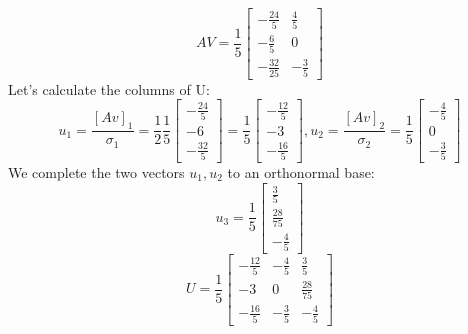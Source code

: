 \documentclass{article}
\begin{document}
	\[
	AV=\frac{1}{5}
	\begin{bmatrix}
	-\frac{24}{5} & \frac{4}{5} \\
	-\frac{6}{5} & 0 \\
	-\frac{32}{25} & -\frac{3}{5}
	\end{bmatrix}
	\]
	Let's calculate the columns of U:
	\[
	u_{1}=\frac{[Av]_{1}}{\sigma_{1}}=\frac{1}{2}\frac{1}{5}
	\begin{bmatrix}
	-\frac{24}{5} \\
	-6 \\
	-\frac{32}{5}
	\end{bmatrix}
	=
	\frac{1}{5}
	\begin{bmatrix}
	-\frac{12}{5} \\
	-3 \\
	-\frac{16}{5}
	\end{bmatrix},
	u_{2}=\frac{[Av]_{2}}{\sigma_{2}}=\frac{1}{5}
	\begin{bmatrix}
	-\frac{4}{5} \\
	0 \\
	-\frac{3}{5}
	\end{bmatrix}
	\]
	We complete the two vectors $u_{1},u_{2}$ to an orthonormal base:
	\[
	u_{3}=
	\frac{1}{5}	
	\begin{bmatrix}
	\frac{3}{5} \\
	\frac{28}{75} \\
	-\frac{4}{5}	
	\end{bmatrix}	
	\]
	\[		
	U=
	\frac{1}{5}
	\begin{bmatrix}
	-\frac{12}{5} & -\frac{4}{5} & \frac{3}{5}\\
	-3 & 0 & \frac{28}{75}\\
	-\frac{16}{5} & -\frac{3}{5} & -\frac{4}{5}
	\end{bmatrix}
	\]
	
\end{document}

